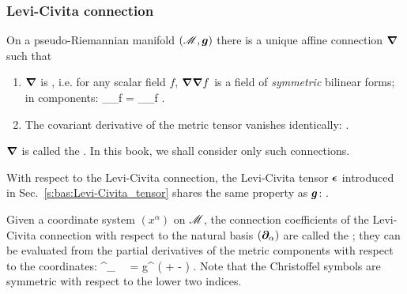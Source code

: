\subsubsection{Levi-Civita connection} \label{s:bas:Levi-Civita_connect}

On a pseudo-Riemannian manifold $(\mathscr{M},\bm{g})$ there is a unique affine connection
$\bm{\nabla}$ such that
\begin{enumerate}
\item $\bm{\nabla}$ is , i.e. for any scalar field $f$,
$\bm{\nabla}\bm{\nabla} f$ is a field of \emph{symmetric} bilinear forms; in components:
\be \label{e:bas:torsion-free}
  \nabla_\alpha\nabla_\beta f = \nabla_\beta\nabla_\alpha f .
\ee
\item The covariant derivative of the metric tensor vanishes identically:
\be
   .
\ee
\end{enumerate}
$\bm{\nabla}$ is called the .
In this book, we shall consider only such connections.

With respect to the Levi-Civita connection, the Levi-Civita tensor $\bm{\epsilon}$ introduced
in Sec.~\ref{s:bas:Levi-Civita_tensor} shares the same property as $\bm{g}$:
\be \label{e:bas:nab_eps}
   .
\ee

Given a coordinate system $(x^\alpha)$ on $\mathscr{M}$, the connection coefficients of the
Levi-Civita connection with respect to the natural basis $(\bm{\partial}_\alpha)$
are called the ; they
can be evaluated
from the partial derivatives of the metric components with respect to the coordinates:
\be \label{e:bas:Christoffel}
  \Gamma^\gamma_{\ \ \alpha\beta} =  g^{\gamma\mu}
	\left(  + 
	-  \right) .
\ee
Note that the Christoffel symbols are symmetric with respect to the lower two indices.

